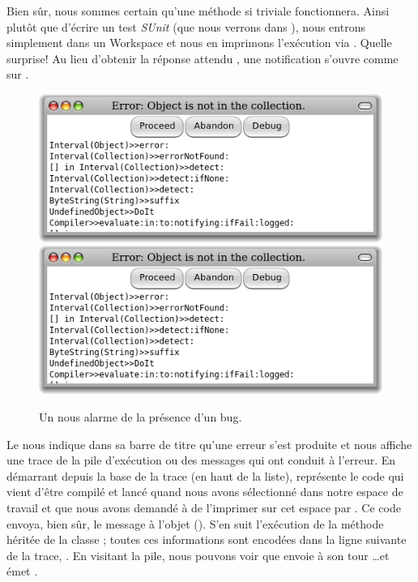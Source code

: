 \documentclass[a4paper,10pt,twoside]{book}
\begin{document}
Bien s\^ur, nous sommes certain qu'une m\'ethode si triviale fonctionnera.
Ainsi plut\^ot que d'\'ecrire un test \emph{SUnit} 
(que nous verrons dans ),
nous entrons simplement  dans un Workspace
et nous en imprimons l'ex\'ecution via .
Quelle surprise! Au lieu d'obtenir la r\'eponse attendu , 
une notification  s'ouvre comme sur
.

\begin{figure}[btp]
	\begin{center}
	\ifluluelse
		{\includegraphics[width=\textwidth]{PreDebugWindow}}
		{\includegraphics[scale=0.7]{PreDebugWindow}}
	\end{center}
	\caption{Un  nous alarme de la pr\'esence d'un bug.}
	\label{fig:PreDebugWindow}
\end{figure}

Le  nous indique dans sa barre de titre
qu'une erreur s'est produite et nous affiche une trace de la pile d'ex\'ecution
ou  des messages qui ont conduit \`a l'erreur.
En d\'emarrant depuis la base de la trace
(en haut de la liste),
  repr\'esente le code qui vient d'\^etre compil\'e
et lanc\'e quand nous avons s\'electionn\'e  
dans notre espace de travail et que nous avons
demand\'e \`a \pharo de l'imprimer sur cet espace par .
Ce code envoya, bien s\^ur, le message  \`a
l'objet  ().
S'en suit l'ex\'ecution de la m\'ethode  h\'erit\'ee de la
classe ;
toutes ces informations sont encod\'ees dans la ligne suivante de la trace,
.
En visitant la pile, nous pouvons voir que  envoie
\`a son tour \ldots et  \'emet .
\end{document}
